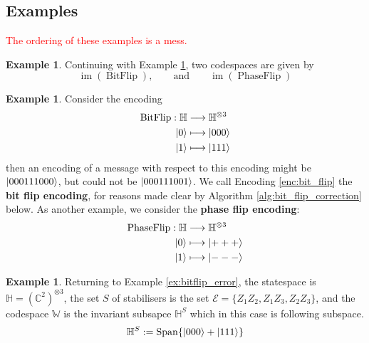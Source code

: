 \documentclass[12pt]{article}
\theoremstyle{plain}
\theoremstyle{definition}
\newtheorem{example}[thm]{Example}
\newcommand{\bb}[1]{\mathbb{#1}}
\newcommand{\scr}[1]{\mathscr{#1}}
\newcommand{\lto}{\longrightarrow}
\begin{document}
\subsection{Examples}
\textcolor{red}{The ordering of these examples is a mess.}

\begin{example}
	Continuing with Example \ref{ex:bit_flip_coding}, two codespaces are given by
	\begin{equation}
		\operatorname{im}(\operatorname{BitFlip}),\qquad\text{and}\qquad\operatorname{im}(\operatorname{PhaseFlip})
	\end{equation}
\end{example}
\begin{example}\label{ex:bit_flip_coding}
	Consider the encoding
	\begin{align}\label{enc:bit_flip}
		\operatorname{BitFlip}: \bb{H} &\lto \bb{H}^{\otimes 3}\\
		\ket{0} &\longmapsto \ket{000}\\
		\ket{1} &\longmapsto \ket{111}
	\end{align}
	then an encoding of a message with respect to this encoding might be $\ket{000111000}$, but could not be $\ket{000111001}$. We call Encoding \ref{enc:bit_flip} the \textbf{bit flip encoding}, for reasons made clear by Algorithm \ref{alg:bit_flip_correction} below. As another example, we consider the \textbf{phase flip encoding}:
	\begin{align*}
		\operatorname{PhaseFlip}: \bb{H} &\lto \bb{H}^{\otimes 3}\\
		\ket{0} &\longmapsto \ket{+++}\\
		\ket{1} &\longmapsto \ket{---}
	\end{align*}
\end{example}
\begin{example}
	Returning to Example \ref{ex:bitflip_error}, the statespace is $\bb{H} = (\bb{C}^2)^{\otimes 3}$, the set $S$ of stabilisers is the set $\scr{E} = \lbrace Z_1Z_2, Z_1Z_3,Z_2Z_3\rbrace$, and the codespace $\bb{W}$ is the invariant subsapce $\bb{H}^S$ which in this case is following subspace.
	\begin{equation}
		\bb{H}^S := \operatorname{Span}\lbrace \ket{000} + \ket{111}\rbrace
	\end{equation}
\end{example}
\end{document}
